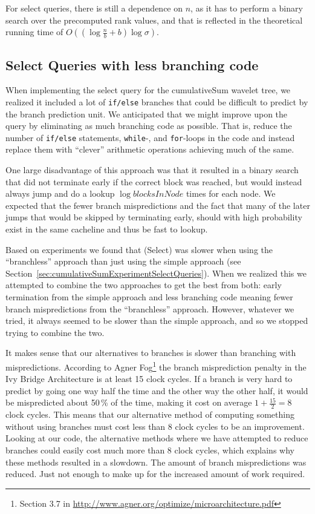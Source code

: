 For select queries, there is still a dependence on $n$, as it has to perform a binary search over the precomputed rank values, and that is reflected in the theoretical running time of $O((\log \frac{n}{b} + b) \log \sigma)$.

\subsection{Select Queries with less branching code}
When implementing the select query for the cumulativeSum wavelet tree, we realized it included a lot of \texttt{if/else} branches that could be difficult to predict by the branch prediction unit.
We anticipated that we might improve upon the query by eliminating as much branching code as possible.
That is, reduce the number of \texttt{if/else} statements, \texttt{while}-, and \texttt{for}-loops in the code and instead replace them with “clever” arithmetic operations achieving much of the same.

One large disadvantage of this approach was that it resulted in a binary search that did not terminate early if the correct block was reached, but would instead always jump and do a lookup $\log \mathit{blocksInNode}$ times for each node.
We expected that the fewer branch mispredictions and the fact that many of the later jumps that would be skipped by terminating early, should with high probability exist in the same cacheline and thus be fast to lookup.

Based on experiments we found that \textproc(Select) was slower when using the “branchless” approach than just using the simple approach (see Section~\ref{sec:cumulativeSumExperimentSelectQueries}).
When we realized this we attempted to combine the two approaches to get the best from both: early termination from the simple approach and less branching code meaning fewer branch mispredictions from the “branchless” approach.
However, whatever we tried, it always seemed to be slower than the simple approach, and so we stopped trying to combine the two.

It makes sense that our alternatives to branches is slower than branching with mispredictions.
According to Agner Fog\footnote{Section 3.7 in \url{http://www.agner.org/optimize/microarchitecture.pdf}} the branch misprediction penalty in the Ivy Bridge Architecture is at least 15 clock cycles.
If a branch is very hard to predict by going one way half the time and the other way the other half, it would be mispredicted about 50\,\% of the time, making it cost on average $1+\frac{15}{2}=8$ clock cycles.
This means that our alternative method of computing something without using branches must cost less than 8 clock cycles to be an improvement.
Looking at our code, the alternative methods where we have attempted to reduce branches could easily cost much more than 8 clock cycles, which explains why these methods resulted in a slowdown.
The amount of branch mispredictions was reduced. Just not enough to make up for the increased amount of work required.

